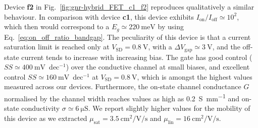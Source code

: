 %
Device \textbf{f2} in Fig.~\ref{fig:gnr-hybrid_FET_c1_f2} reproduces qualitatively a similar behaviour. In comparison with device \textbf{c1}, this device exhibits $I_\textrm{on}/I_\textrm{off}\simeq 10^2$, which then would correspond to a $E_g\simeq\SI{220}{\milli\electronvolt}$ by using Eq.~\ref{eq:on_off_ratio_bandgap}. The peculiarity of this device is that a current saturation limit is reached only at $V_\textrm{SD}=\SI{0.8}{\volt}$, with a $\Delta V_\textrm{gap}\simeq\SI{3}{\volt}$, and the off-state current tends to increase with increasing bias. The gate has good control ($SS\simeq\SI{400}{\milli\volt}$~dec$^{-1}$) over the conductive channel at small biases, and excellent control $SS\simeq\SI{160}{\milli\volt}$~dec$^{-1}$ at $V_\textrm{SD}=\SI{0.8}{\volt}$, which is amongst the highest values measured across our devices. Furthermore, the on-state channel conductance $G$ normalised by the channel width reaches values as high as \SI{0.2}{\siemens\per\milli\metre} and on-state conductivity $\sigma\simeq\SI{6}{\micro\siemens}$. We report slightly higher values for the mobility of this device as we extracted $\mu_\textrm{sat}=\SI{3.5}{\centi\metre\squared\per\volt\per\second}$ and $\mu_\textrm{lin}=\SI{16}{\centi\metre\squared\per\volt\per\second}$.

